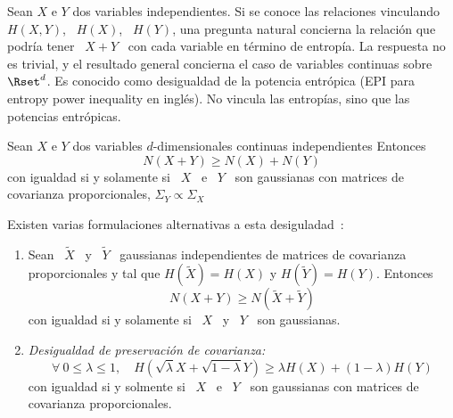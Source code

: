 

Sean  $X$ e  $Y$  dos variables  independientes.   Si se  conoce las  relaciones
vinculando \  $H(X,Y)$, \  $H(X)$, \ $H(Y)$,  una pregunta natural  concierna la
relaci\'on  que podr\'ia  tener \  $X+Y$  \ con  cada variable  en t\'ermino  de
entrop\'ia. La respuesta no es trivial, y el resultado general concierna el caso
de  variables continuas  sobre $\Rset^d$.   Es conocido  como desigualdad  de la
potencia entr\'opica (EPI para entropy power inequality en ingl\'es). No vincula
las entrop\'ias, sino que las potencias entr\'opicas.
%
\begin{teorema}
  Sean  $X$  e $Y$  dos  variables  $d$-dimensionales continuas  independientes
  Entonces
  \[
  N(X + Y) \ge N(X) + N(Y)
  \]
%
  con igualdad si y  solamente si \ $X$ \ e \ $Y$  \ son gaussianas con matrices
  de covarianza proporcionales, $\Sigma_Y \propto \Sigma_X$
\end{teorema}
%
\noindent     Existen    varias     formulaciones     alternativas    a     esta
desiguladad~\cite{Sha48, Lie78, CovTho06, DemCov91, Rio07}:
%
\begin{enumerate}
\item\label{EPI:SZ:EquivGauss} Sean  \ $\widetilde{X}$  \ y \  $\widetilde{Y}$ \
  gaussianas independientes  de matrices de covarianza proporcionales  y tal que
  $H(\widetilde{X}) = H(X)$ y $H(\widetilde{Y}) = H(Y)$.  Entonces
  \[
  N(X+Y) \ge N\left( \widetilde{X} + \widetilde{Y} \right)
  \]
  con igualdad si y solamente si \ $X$ \ y \ $Y$ \ son gaussianas.
%
\item\label{EPI:SZ:PresCov}    {\it    Desigualdad    de    preservaci\'on    de
    covarianza:}
  \[
  \forall  \:   0  \le  \lambda  \le   1,  \quad  H\left(   \sqrt{\lambda}  X  +
    \sqrt{1-\lambda} Y \right) \ge \lambda H(X) + (1-\lambda) H(Y)
  \]
  con igualdad si y solmente si \ $X$ \ e \ $Y$ \ son gaussianas con matrices de
  covarianza proporcionales.
\end{enumerate}
%

